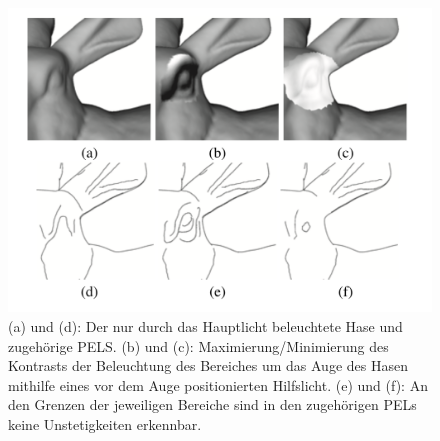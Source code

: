 \documentclass{paperStyle}
\begin{document}
\begin{figure}
	\centering
		\includegraphics[width=0.7\linewidth]{rabbit.png}
	\caption{(a) und (d): Der nur durch das Hauptlicht beleuchtete Hase und zugehörige PELS. (b) und (c): Maximierung/Minimierung des Kontrasts der Beleuchtung des Bereiches um das Auge des Hasen mithilfe eines vor dem Auge positionierten Hilfslicht. (e) und (f): An den Grenzen der jeweiligen Bereiche sind in den zugehörigen PELs keine Unstetigkeiten erkennbar. \cite{Xie2007}}
	\label{fig:rabbit}
\end{figure}
\end{document}
